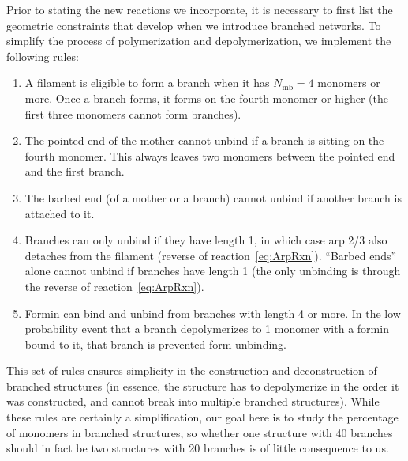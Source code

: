\documentclass[11pt]{article}
\begin{document}
Prior to stating the new reactions we incorporate, it is necessary to first list the geometric constraints that develop when we introduce branched networks. To simplify the process of polymerization and depolymerization, we implement the following rules:
\begin{enumerate}
\item A filament is eligible to form a branch when it has $N_\text{mb}=4$ monomers or more. Once a branch forms, it forms on the fourth monomer or higher (the first three monomers cannot form branches). 
\item The pointed end of the mother cannot unbind if a branch is sitting on the fourth monomer. This always leaves two monomers between the pointed end and the first branch. 
\item The barbed end (of a mother or a branch) cannot unbind if another branch is attached to it. 
\item Branches can only unbind if they have length 1, in which case arp 2/3 also detaches from the filament (reverse of reaction\ \eqref{eq:ArpRxn}). ``Barbed ends'' alone cannot unbind if branches have length 1 (the only unbinding is through the reverse of reaction\ \eqref{eq:ArpRxn}).
\item Formin can bind and unbind from branches with length 4 or more. In the low probability event that a branch depolymerizes to 1 monomer with a formin bound to it, that branch is prevented form unbinding. 
\end{enumerate}
This set of rules ensures simplicity in the construction and deconstruction of branched structures (in essence, the structure has to depolymerize in the order it was constructed, and cannot break into multiple branched structures). While these rules are certainly a simplification, our goal here is to study the percentage of monomers in branched structures, so whether one structure with 40 branches should in fact be two structures with 20 branches is of little consequence to us. 
\end{document}
